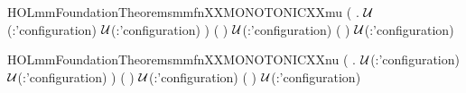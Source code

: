 \begin{SaveVerbatim}{HOLmmFoundationTheoremsmmfnXXMONOTONICXXmu}
\HOLTokenTurnstile{} (\HOLSymConst{\HOLTokenForall{}} .
         \HOLSymConst{\HOLTokenImp{}}
         \ensuremath{\cal{U}}(:'configuration)  \HOLConst{\HOLTokenSubset{}}
         \ensuremath{\cal{U}}(:'configuration) ) \HOLSymConst{\HOLTokenImp{}}
      \HOLSymConst{\HOLTokenImp{}}
     (  ) \ensuremath{\cal{U}}(:'configuration)  \HOLConst{\HOLTokenSubset{}}
     (  ) \ensuremath{\cal{U}}(:'configuration) 
\end{SaveVerbatim}
\newcommand{\HOLmmFoundationTheoremsmmfnXXMONOTONICXXmu}{\UseVerbatim{HOLmmFoundationTheoremsmmfnXXMONOTONICXXmu}}
\begin{SaveVerbatim}{HOLmmFoundationTheoremsmmfnXXMONOTONICXXnu}
\HOLTokenTurnstile{} (\HOLSymConst{\HOLTokenForall{}} .
         \HOLSymConst{\HOLTokenImp{}}
         \ensuremath{\cal{U}}(:'configuration)  \HOLConst{\HOLTokenSubset{}}
         \ensuremath{\cal{U}}(:'configuration) ) \HOLSymConst{\HOLTokenImp{}}
      \HOLSymConst{\HOLTokenImp{}}
     (  ) \ensuremath{\cal{U}}(:'configuration)  \HOLConst{\HOLTokenSubset{}}
     (  ) \ensuremath{\cal{U}}(:'configuration) 
\end{SaveVerbatim}
\newcommand{\HOLmmFoundationTheoremsmmfnXXMONOTONICXXnu}{\UseVerbatim{HOLmmFoundationTheoremsmmfnXXMONOTONICXXnu}}
